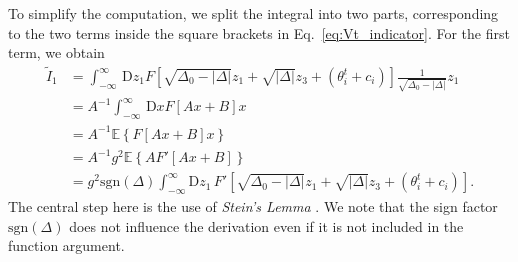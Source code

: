 \documentclass[reprint,amsmath,amssymb,aps]{revtex4-2}
\begin{document}
To simplify the computation, we split the integral into two parts, corresponding to the two terms inside the square brackets in Eq.~\eqref{eq:Vt_indicator}.  
For the first term, we obtain
\begin{align}
\label{eq:lemmastein1}
    \tilde{I}_1
    &= 
    \int_{-\infty}^{\infty}\, \mathrm{D}z_1 F\left[ \sqrt{\Delta_0 - |\Delta|} z_1 + \sqrt{|\Delta|}z_3 + (\theta_i^t +c_i)\right] \frac{1}{\sqrt{\Delta_0 - |\Delta|}} z_1
    \nonumber
    \\
    &=
    A^{-1} \int_{-\infty}^{\infty}\, \mathrm{D}x F\left[ A x + B\right] x
    \nonumber
    \\
    &=
    A^{-1} \mathbb{E}\left\{ F\left[ A x + B\right] x \right\}
    \nonumber
    \\
    &=
    A^{-1} g^2\mathbb{E}\left\{A F'\left[ A x + B\right] \right\} 
    \nonumber
    \\
    &=
    g^2 \mathrm{sgn}(\Delta) \int_{-\infty}^{\infty} \mathrm{D}z_1\, F'\left[ \sqrt{\Delta_0 - |\Delta|} z_1 + \sqrt{|\Delta|}z_3 + (\theta_i^t +c_i)\right].
\end{align}
The central step here is the use of \textit{Stein's Lemma} \cite{ChenGoldsteinShao2011}. We note that the sign factor $\mathrm{sgn}(\Delta)$ does not influence the derivation even if it is not included in the function argument.
\end{document}
